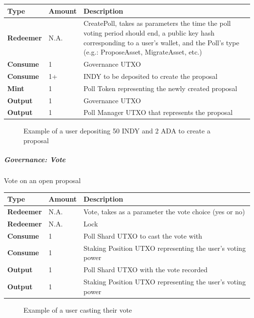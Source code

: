 \documentclass{article}
\begin{document}
\begin{sloppypar}
\begin{tabularx}{\linewidth}{l|l|L}
\toprule
\textbf{Type} & \textbf{Amount} & \textbf{Description}
\tabularnewline
\midrule
\endhead
\textbf{Redeemer} & N.A. & CreatePoll, takes as parameters the time the
poll voting period should end, a public key hash corresponding to a
user's wallet, and the Poll's type (e.g.: ProposeAsset, MigrateAsset,
etc.)
\tabularnewline
\midrule
\textbf{Consume} & 1 & Governance UTXO
\tabularnewline
\midrule
\textbf{Consume} & 1+ & INDY to be deposited to create the
proposal
\tabularnewline
\midrule
\textbf{Mint} & 1 & Poll Token representing the newly created
proposal
\tabularnewline
\midrule
\textbf{Output} & 1 & Governance UTXO
\tabularnewline
\midrule
\textbf{Output} & 1 & Poll Manager UTXO that represents the
proposal
\tabularnewline
\bottomrule
\end{tabularx}

\hypertarget{governance-create-proposal-figure}{%
\begin{figure}[htbp]
\centering

\caption{Example of a user depositing 50 INDY and 2 ADA to create
a proposal}
\label{governance-create-proposal-figure}
\end{figure}}

\hypertarget{governance-vote}{%
\subparagraph{Governance: Vote}\label{governance-vote}}

Vote on an open proposal

\begin{tabularx}{\linewidth}{l|l|L}
\toprule
\textbf{Type} & \textbf{Amount} & \textbf{Description}
\tabularnewline
\midrule
\endhead
\textbf{Redeemer} & N.A. & Vote, takes as a parameter the vote choice
(yes or no)
\tabularnewline
\midrule
\textbf{Redeemer} & N.A. & Lock
\tabularnewline
\midrule
\textbf{Consume} & 1 & Poll Shard UTXO to cast the vote
with
\tabularnewline
\midrule
\textbf{Consume} & 1 & Staking Position UTXO representing the user's
voting power
\tabularnewline
\midrule
\textbf{Output} & 1 & Poll Shard UTXO with the vote
recorded
\tabularnewline
\midrule
\textbf{Output} & 1 & Staking Position UTXO representing the user's
voting power
\tabularnewline
\bottomrule
\end{tabularx}

\hypertarget{governance-vote-figure}{%
\begin{figure}[htbp]
\centering

\caption{Example of a user casting their vote}
\label{governance-vote-figure}
\end{figure}}


\end{sloppypar}
\end{document}
